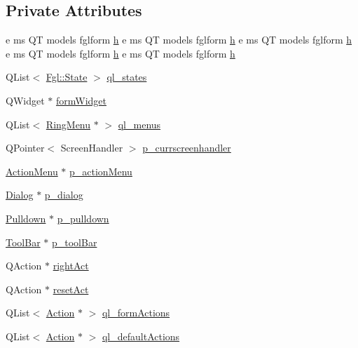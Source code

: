 \subsection*{Private Attributes}
\begin{DoxyCompactItemize}
\item 
e ms QT models fglform \hyperlink{classFglForm_a2adf651bccc4bd01a985a0c5bde45af7}{h} e ms QT models fglform \hyperlink{classFglForm_a2adf651bccc4bd01a985a0c5bde45af7}{h} e ms QT models fglform \hyperlink{classFglForm_a2adf651bccc4bd01a985a0c5bde45af7}{h} e ms QT models fglform \hyperlink{classFglForm_a2adf651bccc4bd01a985a0c5bde45af7}{h} e ms QT models fglform \hyperlink{classFglForm_a2adf651bccc4bd01a985a0c5bde45af7}{h}
\item 
QList$<$ \hyperlink{namespaceFgl_a66700792cb225549384ae76c1057cf22}{Fgl::State} $>$ \hyperlink{classFglForm_a18774054d5c9773a7075b5933b0bbc9a}{ql\_\-states}
\item 
QWidget $\ast$ \hyperlink{classFglForm_a382565fe4e148f5e37aabea41e079809}{formWidget}
\item 
QList$<$ \hyperlink{classRingMenu}{RingMenu} $\ast$ $>$ \hyperlink{classFglForm_a587196a08706e03ec05f1fae4048f344}{ql\_\-menus}
\item 
QPointer$<$ ScreenHandler $>$ \hyperlink{classFglForm_a98e11b2d55100f907821e3a8281b4ab5}{p\_\-currscreenhandler}
\item 
\hyperlink{classActionMenu}{ActionMenu} $\ast$ \hyperlink{classFglForm_aace1d4f7b637af4d3aa86e53a770152e}{p\_\-actionMenu}
\item 
\hyperlink{classDialog}{Dialog} $\ast$ \hyperlink{classFglForm_afa28d86c6e353e3e31c677b463199a4a}{p\_\-dialog}
\item 
\hyperlink{classPulldown}{Pulldown} $\ast$ \hyperlink{classFglForm_a87a0ac69973f45c48fb629d04ac5b364}{p\_\-pulldown}
\item 
\hyperlink{classToolBar}{ToolBar} $\ast$ \hyperlink{classFglForm_a63ee680575b50bd02473649cd3d272f5}{p\_\-toolBar}
\item 
QAction $\ast$ \hyperlink{classFglForm_ac85748725f2a9ba437e62be1293eae02}{rightAct}
\item 
QAction $\ast$ \hyperlink{classFglForm_aa9bb2c29fa0161164dd5250a7602a1be}{resetAct}
\item 
QList$<$ \hyperlink{classAction}{Action} $\ast$ $>$ \hyperlink{classFglForm_a091b50c03ba4a353485d34ea34f4001a}{ql\_\-formActions}
\item 
QList$<$ \hyperlink{classAction}{Action} $\ast$ $>$ \hyperlink{classFglForm_acc7f6b6c7b13cf1e6e39bfdeba18ddc1}{ql\_\-defaultActions}

\end{DoxyCompactItemize}
